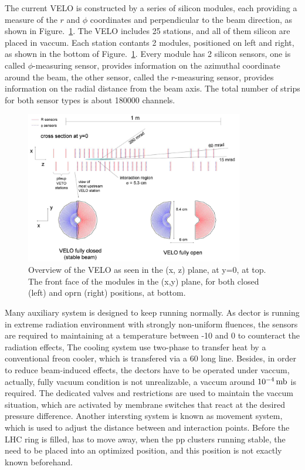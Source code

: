 The current VELO is constructed by a series of silicon modules, 
each providing a measure of the $r$ and $\phi$ coordinates and perpendicular to the beam direction,
as shown in Figure.~\ref{fig:VELO}.
The VELO includes 25 stations, 
and all of them silicon are placed in vaccum.
Each station contants 2 modules,
positioned on left and right,
as shown in the bottom of Figure.~\ref{fig:VELO}.
Every module has 2 silicon sensors,
one is called $\phi$-measuring sensor,
provides information on the azimuthal coordinate around the beam,
the other sensor,
called the $r$-measuring sensor, 
provides information on the radial distance from the beam axis.
The total number of strips for both sensor types is about 180000 channels.

\begin{figure}[!hbtp]
\centering
\includegraphics[width=0.85\textwidth]{Figures/02_Detector/VELO}%
\caption{ Overview of the VELO as seen in the (x, z) plane, at y=0, at top. 
	The front face of the modules in the (x,y) plane, for both closed (left) and oprn (right) positions, at bottom\supercite{LHCb-DP-2008-001}.}
\label{fig:VELO}
\end{figure}

Many auxiliary system is designed to keep \velo running normally.
As \velo dector is running in extreme radiation environment with strongly non-uniform fluences,
the sensors are required to maintaining at a temperature between -10 and 0 \degc to counteract the radiation effects, 
The cooling system use two-phase \cotwo to transfer heat by a conventional freon cooler,
which is transfered via a 60 \m long line.
Besides, 
in order to reduce beam-induced effects,
the dectors have to be operated under vaccum,
actually,
fully vacuum condition is not unrealizable,
a vaccum around $10^{-4} \text{\,mb}$ is required.
The dedicated valves and restrictions are used to maintain the vaccum situation,
which are activated by membrane switches that react at the desired pressure difference. 
Another intersting system is known as movement system,
which is used to adjust the distance between \velo and interaction points.
Before the LHC ring is filled, 
\velo has to move away,
when the pp clusters running stable,
the \velo need to be placed into an optimized position,
and this position is not exactly known beforehand.

